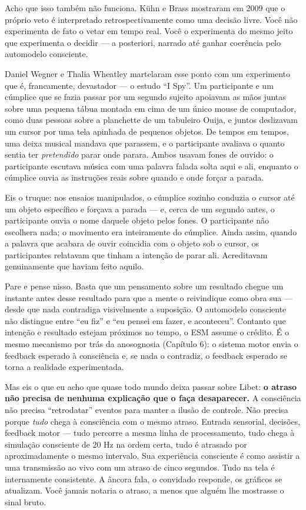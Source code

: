 \documentclass[11pt, twoside, openright]{book}
\begin{document}
Acho que isso também não funciona. Kühn e Brass mostraram em 2009 que o próprio veto é interpretado retrospectivamente como uma decisão livre. Você não experimenta de fato o vetar em tempo real. Você o experimenta do mesmo jeito que experimenta o decidir --- a posteriori, narrado até ganhar coerência pelo automodelo consciente.

Daniel Wegner e Thalia Wheatley martelaram esse ponto com um experimento que é, francamente, devastador --- o estudo ``I Spy''. Um participante e um cúmplice que se fazia passar por um segundo sujeito apoiavam as mãos juntas sobre uma pequena tábua montada em cima de um único mouse de computador, como duas pessoas sobre a planchette de um tabuleiro Ouija, e juntos deslizavam um cursor por uma tela apinhada de pequenos objetos. De tempos em tempos, uma deixa musical mandava que parassem, e o participante avaliava o quanto sentia ter \textit{pretendido} parar onde parara. Ambos usavam fones de ouvido: o participante escutava música com uma palavra falada solta aqui e ali, enquanto o cúmplice ouvia as instruções reais sobre quando e onde forçar a parada.

Eis o truque: nos ensaios manipulados, o cúmplice sozinho conduzia o cursor até um objeto específico e forçava a parada --- e, cerca de um segundo antes, o participante ouvia o nome daquele objeto pelos fones. O participante não escolhera nada; o movimento era inteiramente do cúmplice. Ainda assim, quando a palavra que acabara de ouvir coincidia com o objeto sob o cursor, os participantes relatavam que tinham a intenção de parar ali. Acreditavam genuinamente que haviam feito aquilo.

Pare e pense nisso. Basta que um pensamento sobre um resultado chegue um instante antes desse resultado para que a mente o reivindique como obra sua --- desde que nada contradiga visivelmente a suposição. O automodelo consciente não distingue entre ``eu fiz'' e ``eu pensei em fazer, e aconteceu''. Contanto que intenção e resultado estejam próximos no tempo, o ESM assume o crédito. É o mesmo mecanismo por trás da anosognosia (Capítulo 6): o sistema motor envia o feedback esperado à consciência e, se nada o contradiz, o feedback esperado se torna a realidade experimentada.

Mas eis o que eu acho que quase todo mundo deixa passar sobre Libet: \textbf{o atraso não precisa de nenhuma explicação que o faça desaparecer.} A consciência não precisa ``retrodatar'' eventos para manter a ilusão de controle. Não precisa porque \textit{tudo} chega à consciência com o mesmo atraso. Entrada sensorial, decisões, feedback motor --- tudo percorre a mesma linha de processamento, tudo chega à simulação consciente de 20 Hz na ordem certa, tudo é atrasado por aproximadamente o mesmo intervalo. Sua experiência consciente é como assistir a uma transmissão ao vivo com um atraso de cinco segundos. Tudo na tela é internamente consistente. A âncora fala, o convidado responde, os gráficos se atualizam. Você jamais notaria o atraso, a menos que alguém lhe mostrasse o sinal bruto.
\end{document}
